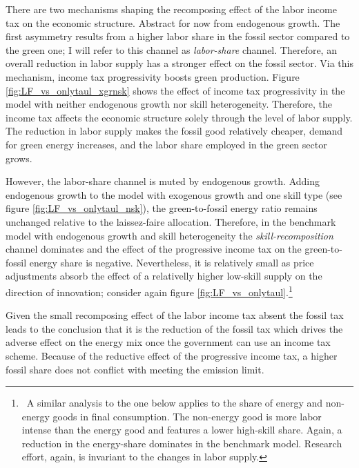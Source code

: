 There are two mechanisms shaping the recomposing effect of the labor income tax on the economic structure. Abstract for now from endogenous growth.
The first asymmetry results from a higher labor share in the fossil sector compared to the green one; I will refer to this channel as \textit{labor-share} channel. Therefore, an overall reduction in labor supply has a stronger effect on the fossil sector. Via this mechanism, income tax progressivity boosts green production. Figure \ref{fig:LF_vs_onlytaul_xgrnsk} shows the effect of income tax progressivity in the model with neither endogenous growth nor skill heterogeneity. Therefore, the income tax affects the economic structure solely through the level of labor supply. The reduction in labor supply makes the fossil good relatively cheaper, demand for green energy increases, and the labor share employed in the green sector grows.  

However, the labor-share channel is muted by endogenous growth. Adding endogenous growth to the model with exogenous growth and one skill type (see figure \ref{fig:LF_vs_onlytaul_nsk}), the green-to-fossil energy ratio remains unchanged relative to the laissez-faire allocation. 
Therefore, in the benchmark model with endogenous growth and skill heterogeneity the \textit{skill-recomposition} channel dominates and the effect of the progressive income tax on the green-to-fossil energy share is negative. Nevertheless, it is relatively small as price adjustments absorb the effect of a relativelly higher low-skill supply on the direction of innovation; consider again figure \ref{fig:LF_vs_onlytaul}.\footnote{\ A similar analysis to the one below applies to the share of energy and non-energy goods in final consumption. The non-energy good is more labor intense than the energy good and features a lower high-skill share. Again, a reduction in the energy-share dominates in the benchmark model. Research effort, again, is invariant to the changes in labor supply. }

Given the small recomposing effect of the labor income tax absent the fossil tax leads to the conclusion that it is the reduction of the fossil tax which drives the adverse effect on the energy mix once the government can use an income tax scheme. 
Because of the reductive effect of the progressive income tax, a higher fossil share does not conflict with meeting the emission limit. 

